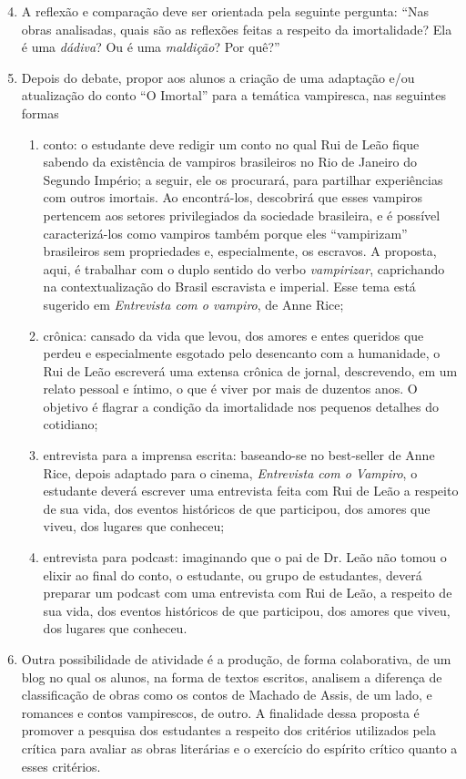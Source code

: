 \documentclass{extarticle}
\begin{document}
\begin{enumerate}\setcounter{enumi}{3}
\item A reflexão e comparação deve ser orientada pela seguinte pergunta:
``Nas obras analisadas, quais são as reflexões feitas a respeito da
imortalidade? Ela é uma \emph{dádiva}? Ou é uma \emph{maldição}? Por
quê?''

\item Depois do debate, propor aos alunos a criação de uma adaptação e/ou
atualização do conto ``O Imortal'' para a temática vampiresca, nas
seguintes formas

\begin{enumerate}
\item conto: o estudante deve redigir um conto no qual Rui de Leão fique
sabendo da existência de vampiros brasileiros no Rio de Janeiro do
Segundo Império; a seguir, ele os procurará, para partilhar experiências
com outros imortais. Ao encontrá-los, descobrirá que esses vampiros
pertencem aos setores privilegiados da sociedade brasileira, e é
possível caracterizá-los como vampiros também porque eles ``vampirizam''
brasileiros sem propriedades e, especialmente, os escravos. A proposta,
aqui, é trabalhar com o duplo sentido do verbo \emph{vampirizar},
caprichando na contextualização do Brasil escravista e imperial. Esse
tema está sugerido em \emph{Entrevista com o vampiro}, de Anne Rice;

\item crônica: cansado da vida que levou, dos amores e entes queridos que
perdeu e especialmente esgotado pelo desencanto com a humanidade, o Rui
de Leão escreverá uma extensa crônica de jornal, descrevendo, em um
relato pessoal e íntimo, o que é viver por mais de duzentos anos. O
objetivo é flagrar a condição da imortalidade nos pequenos detalhes do
cotidiano;

\item entrevista para a imprensa escrita: baseando-se no best-seller de
Anne Rice, depois adaptado para o cinema, \emph{Entrevista com o
Vampiro}, o estudante deverá escrever uma entrevista feita com Rui de
Leão a respeito de sua vida, dos eventos históricos de que participou,
dos amores que viveu, dos lugares que conheceu;

\item entrevista para podcast: imaginando que o pai de Dr. Leão não tomou o
elixir ao final do conto, o estudante, ou grupo de estudantes, deverá
preparar um podcast com uma entrevista com Rui de Leão, a respeito de
sua vida, dos eventos históricos de que participou, dos amores que
viveu, dos lugares que conheceu.
\end{enumerate}

\item Outra possibilidade de atividade é a produção, de forma colaborativa,
de um blog no qual os alunos, na forma de textos escritos, analisem a
diferença de classificação de obras como os contos de Machado de Assis,
de um lado, e romances e contos vampirescos, de outro. A finalidade
dessa proposta é promover a pesquisa dos estudantes a respeito dos
critérios utilizados pela crítica para avaliar as obras literárias e o
exercício do espírito crítico quanto a esses critérios.
\end{enumerate}
\end{document}
